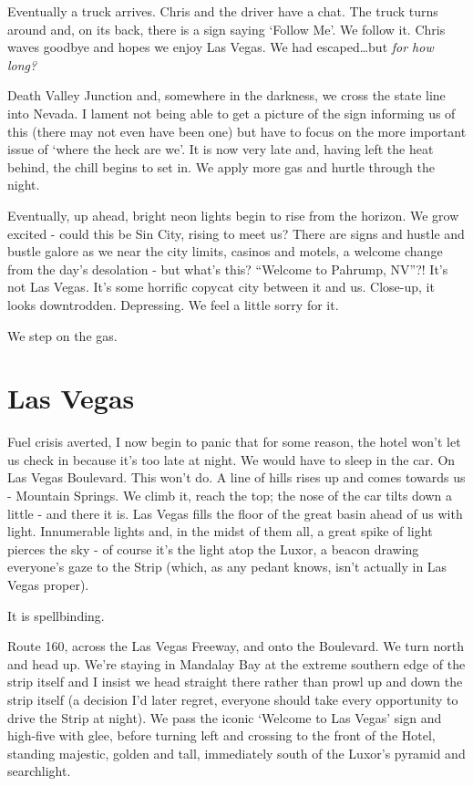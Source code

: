 \documentclass[a5paper,10pt,titlepage,draft]{book}
\begin{document}
Eventually a truck arrives.  Chris and the driver have a chat.  The truck turns around and, on its back, there is a sign saying `Follow Me'.  We follow it.  Chris waves goodbye and hopes we enjoy Las Vegas.  We had escaped\ldots but \emph{for how long?}

Death Valley Junction and, somewhere in the darkness, we cross the state line into Nevada.  I lament not being able to get a picture of the sign informing us of this (there may not even have been one) but have to focus on the more important issue of `where the heck are we'.  It is now very late and, having left the heat behind, the chill begins to set in.  We apply more gas and hurtle through the night.

Eventually, up ahead, bright neon lights begin to rise from the horizon.  We grow excited - could this be Sin City, rising to meet us?  There are signs and hustle and bustle galore as we near the city limits, casinos and motels, a welcome change from the day's desolation - but what's this?  ``Welcome to Pahrump, NV''?!  It's not Las Vegas.  It's some horrific copycat city between it and us.  Close-up, it looks downtrodden.  Depressing.  We feel a little sorry for it.

We step on the gas.

\section*{Las Vegas}
Fuel crisis averted, I now begin to panic that for some reason, the hotel won't let us check in because it's too late at night.  We would have to sleep in the car.  On Las Vegas Boulevard.  This won't do.  A line of hills rises up and comes towards us - Mountain Springs.  We climb it, reach the top; the nose of the car tilts down a little - and there it is.  Las Vegas fills the floor of the great basin ahead of us with light.  Innumerable lights and, in the midst of them all, a great spike of light pierces the sky - of course it's the light atop the Luxor, a beacon drawing everyone's gaze to the Strip (which, as any pedant knows, isn't actually in Las Vegas proper).

It is spellbinding.

Route 160, across the Las Vegas Freeway, and onto the Boulevard.  We turn north and head up.  We're staying in Mandalay Bay at the extreme southern edge of the strip itself and I insist we head straight there rather than prowl up and down the strip itself (a decision I'd later regret, everyone should take every opportunity to drive the Strip at night).  We pass the iconic `Welcome to Las Vegas' sign and high-five with glee, before turning left and crossing to the front of the Hotel, standing majestic, golden and tall, immediately south of the Luxor's pyramid and searchlight.
\end{document}
